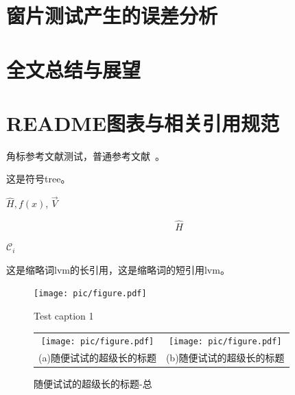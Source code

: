 \documentclass[master]{thesis-uestc}
\begin{document}
\chapter{窗片测试产生的误差分析}
\chapter{全文总结与展望}
\chapter{README图表与相关引用规范}

角标参考文献测试，普通参考文献~\cite{clerc2010discrete}。

这是符号\gls{tree}\cite{liuxf2006}。

$\hat{H}, f(x)$, $\vec{V}$

$$\hat{H}$$

$\mathcal{C}_i$

这是缩略词\acrlong{lvm}的长引用，这是缩略词的短引用\acrshort{lvm}。

\begin{figure}[!htb]
    \texttt{[image: pic/figure.pdf]}
    \caption[short catption 1]{Test caption 1}
\end{figure}


\begin{figure}[!htb]
    \small
    \centering
    \begin{tabular}{@{\ }c@{\ }c}
        \texttt{[image: pic/figure.pdf]} & 
        \hspace{5pt}
        \texttt{[image: pic/figure.pdf]}     \\
        \mbox{\small (a)随便试试的超级长的标题}                                                                               & 
        \mbox{\small (b)随便试试的超级长的标题}                                                                                  \\
    \end{tabular}
    \caption{随便试试的超级长的标题-总}
    \label{fig:test}
\end{figure}
\end{document}
